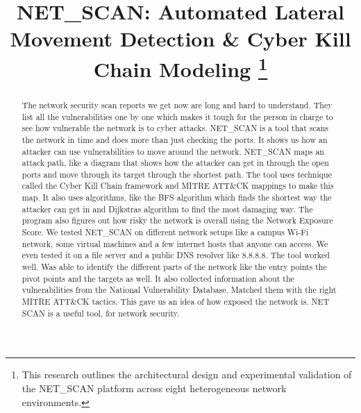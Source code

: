 \documentclass[conference]{IEEEtran}
\begin{document}
\title{NET\_SCAN: Automated Lateral Movement Detection \& Cyber Kill Chain Modeling
\thanks{This research outlines the architectural design and experimental validation of the NET\_SCAN platform across eight heterogeneous network environments.}
}

\author{
\and
{}
\and
{}
}

\maketitle

\begin{abstract}
The network security scan reports we get now are long and hard to understand. They list all the vulnerabilities one by one which makes it tough for the person in charge to see how vulnerable the network is to cyber attacks. NET\_SCAN is a tool that scans the network in time and does more than just checking the ports. It shows us how an attacker can use vulnerabilities to move around the network. NET\_SCAN maps an attack path, like a diagram that shows how the attacker can get in through the open ports and move through its target through the shortest path. The tool uses technique called the Cyber Kill Chain framework and MITRE ATT\&CK mappings to make this map. It also uses algorithms, like the BFS algorithm which finds the shortest way the attacker can get in and Dijkstras algorithm to find the most damaging way. The program also figures out how risky the network is overall using the Network Exposure Score. We tested NET\_SCAN on different network setups like a campus Wi-Fi network, some virtual machines and a few internet hosts that anyone can access. We even tested it on a file server and a public DNS resolver like 8.8.8.8. The tool worked well. Was able to identify the different parts of the network like the entry points the pivot points and the targets as well. It also collected information about the vulnerabilities from the National Vulnerability Database. Matched them with the right MITRE ATT\&CK tactics. This gave us an idea of how exposed the network is. NET SCAN is a useful tool, for network security.
\end{abstract}
\end{document}
